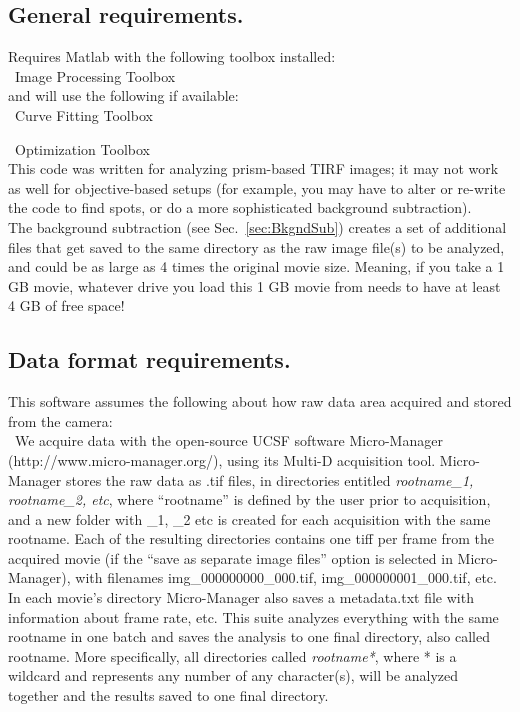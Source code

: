 \documentclass[11pt]{article}
\begin{document}
\subsection{General requirements.}

Requires Matlab with the following toolbox installed:\\

\noindent \textbullet~Image Processing Toolbox\\

\noindent and will use the following if available:\\

\noindent \textbullet~Curve Fitting Toolbox

\noindent \textbullet~Optimization Toolbox\\

\noindent This code was written for analyzing prism-based TIRF images; it may not work as well for objective-based setups (for example, you may have to alter or re-write the code to find spots, or do a more sophisticated background subtraction).\\

\noindent The background subtraction (see Sec.~\ref{sec:BkgndSub}) creates a set of additional files that get saved to the same directory as the raw image file(s) to be analyzed, and could be as large as 4 times the original movie size.  Meaning, if you take a 1 GB movie, whatever drive you load this 1 GB movie from needs to have at least 4 GB of free space! 

\subsection{Data format requirements.}

This software assumes the following about how raw data area acquired and stored from the camera:\\

\noindent \textbullet~We acquire data with the open-source UCSF software Micro-Manager (http://www.micro-manager.org/), using its Multi-D acquisition tool. Micro-Manager stores the raw data as .tif files, in directories entitled \textit{rootname\_1, rootname\_2, etc}, where ``rootname'' is defined by the user prior to acquisition, and a new folder with \_1, \_2 etc is created for each acquisition with the same rootname.  Each of the resulting directories contains one tiff per frame from the acquired movie (if the ``save as separate image files'' option is selected in Micro-Manager), with filenames img\_000000000\_000.tif, img\_000000001\_000.tif, etc. In each movie's directory Micro-Manager also saves a metadata.txt file with information about frame rate, etc.  This suite analyzes everything with the same rootname in one batch and saves the analysis to one final directory, also called rootname.  More specifically, all directories called \textit{rootname*}, where * is a wildcard and represents any number of any character(s), will be analyzed together and the results saved to one final directory. \\
\end{document}
